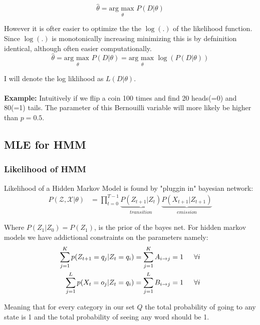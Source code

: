 \begin{equation}
	\hat{\theta} = \underset{\theta}{\text{arg max }} P(D|\theta)
\end{equation}

However it is ofter easier to optimize the the $\log(.)$ of the likelihood function. Since $\log(.)$ is monotonically increasing minimizing this is by defninition identical, although often easier computationally.
\begin{equation}
	\hat{\theta} = \underset{\theta}{\text{arg max }} P(D|\theta) = \underset{\theta}{\text{arg max }} \log(P(D|\theta))
\end{equation}
	
I will denote the log liklihood as $L(D|\theta)$.\\\\

\textbf{Example:} Intuitively if we flip a coin 100 times and find 20 heads(=0) and 80(=1) tails. The parameter of this Bernouilli variable will more likely be higher than $p=0.5$.
	
\subsection{MLE for HMM}
\subsubsection{Likelihood of HMM}
Likelihood of a Hidden Markov Model is found by "pluggin in" bayesian network:
\begin{equation}
	\begin{split}
	P(\mathcal{Z},\mathcal{X}|\theta) &= \prod_{t=0}^{T-1}\underbrace{P(Z_{t+1}|Z_t)}_{transition}\underbrace{P(X_{t+1}|Z_{t+1})}_{emission}
	\end{split}
\end{equation}

Where $P(Z_1|Z_0) = P(Z_1)$, is the prior of the bayes net.
For hidden markov models we have addictional constraints on the parameters namely:
\begin{equation}
	\begin{split}
	\sum_{j=1}^{K}p(Z_{t+1} = q_j|Z_t = q_i)=\sum_{j=1}^{K} A_{i\rightarrow j} &= 1 \indent \forall i\\
	\sum_{j=1}^{L}p(X_{t} = o_j|Z_t = q_i)=\sum_{j=1}^{L} B_{i\rightarrow j} &= 1 \indent \forall i
	\end{split}
\end{equation}
	
Meaning that for every category in our set $Q$ the total probability of going to any state is 1 and the total probability of seeing any word should be 1.
	
